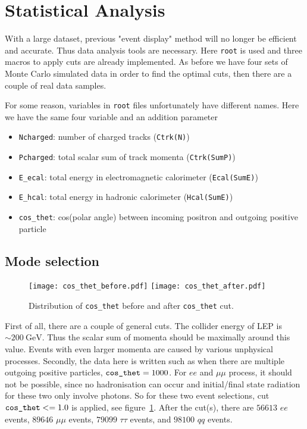 \clearpage
\section{Statistical Analysis}
With a large dataset, previous "event display" method will no longer be efficient and accurate. Thus data analysis tools are necessary. Here \verb|root| is used and three macros to apply cuts are already implemented. As before we have four sets of Monte Carlo simulated data in order to find the optimal cuts, then there are a couple of real data samples.

For some reason, variables in \verb|root| files unfortunately have different names. Here we have the same four variable and an addition parameter~\cite{manual}
\begin{itemize}
	\item \verb|Ncharged|: number of charged tracks (\verb|Ctrk(N)|)
	\item \verb|Pcharged|: total scalar sum of track momenta (\verb|Ctrk(SumP)|)
	\item \verb|E_ecal|: total energy in electromagnetic calorimeter (\verb|Ecal(SumE)|)
	\item \verb|E_hcal|: total energy in hadronic calorimeter (\verb|Hcal(SumE)|)
	\item \verb|cos_thet|: cos(polar angle) between incoming positron and outgoing positive particle
\end{itemize}

\subsection{Mode selection}
\begin{figure}[ht]
	\centering
	\texttt{[image: cos\_thet\_before.pdf]}
	\texttt{[image: cos\_thet\_after.pdf]}
	\cprotect\caption{Distribution of \verb|cos_thet| before and after \verb|cos_thet| cut.}%
	\label{fig:cos_thet_cut}
\end{figure}
First of all, there are a couple of general cuts. The collider energy of LEP is $\sim\SI{200}{\giga\eV}$. Thus the scalar sum of momenta should be maximally around this value. Events with even larger momenta are caused by various unphysical processes. Secondly, the data here is written such as when there are multiple outgoing positive particles, $\verb|cos_thet|=1000$. For $ee$ and $\mu\mu$ process, it should not be possible, since no hadronisation can occur and initial/final state radiation for these two only involve photons. So for these two event selections, cut $\verb|cos_thet| <= 1.0$ is applied, see figure~\ref{fig:cos_thet_cut}. After the cut(s), there are $56613$ $ee$ events, $89646$ $\mu\mu$ events, $79099$ $\tau\tau$ events, and $98100$ $qq$ events.


